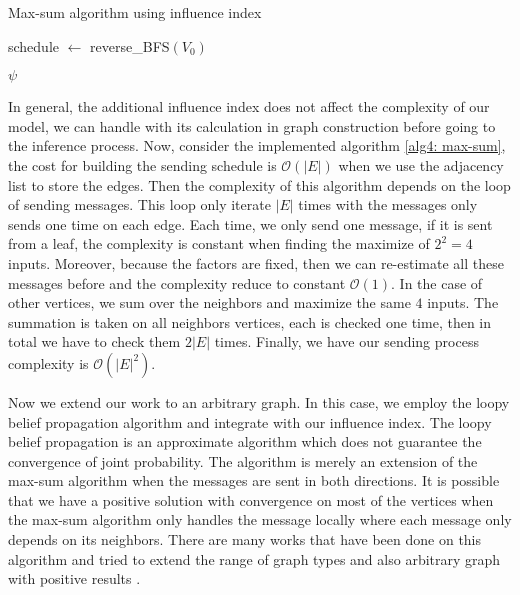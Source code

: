 \begin{algorithm}[H]
	\caption{Max-sum algorithm using influence index}
	\begin{algorithmic}[1]

		\State schedule $\gets$ reverse\_BFS$(V_0)$
		\Else
			\EndIf
		\EndIf
		\EndFor
		
		\RETURN $\psi$
		
		\EndFunction
	\end{algorithmic}
	\label{alg4: max-sum}
\end{algorithm}

In general, the additional influence index does not affect the complexity of our model, we can handle with its calculation in graph construction before going to the inference process. Now, consider the implemented algorithm \ref{alg4: max-sum}, the cost for building the sending schedule is $\mathcal{O}(|E|)$ when we use the adjacency list to store the edges. Then the complexity of this algorithm depends on the loop of sending messages. This loop only iterate $|E|$ times with the messages only sends one time on each edge. Each time, we only send one message, if it is sent from a leaf, the complexity is constant when finding the maximize of $2^2=4$ inputs. Moreover, because the factors are fixed, then we can re-estimate all these messages before and the complexity reduce to constant $\mathcal{O}(1)$. In the case of other vertices, we sum over the neighbors and maximize the same $4$ inputs. The summation is taken on all neighbors vertices, each is checked one time, then in total we have to check them $2|E|$ times. Finally, we have our sending process complexity is $\mathcal{O}(|E|^2)$.

Now we extend our work to an arbitrary graph. In this case, we employ the loopy belief propagation algorithm and integrate with our influence index. The loopy belief propagation is an approximate algorithm which does not guarantee the convergence of joint probability. The algorithm is merely an extension of the max-sum algorithm when the messages are sent in both directions. It is possible that we have a positive solution with convergence on most of the vertices when the max-sum algorithm only handles the message locally where each message only depends on its neighbors. There are many works that have been done on this algorithm and tried to extend the range of graph types and also arbitrary graph with positive results \parencite{DBLP:journals/corr/abs-cs-0508101, pmlr-v2-huang07a, Aji98onthe, 6789575}.

